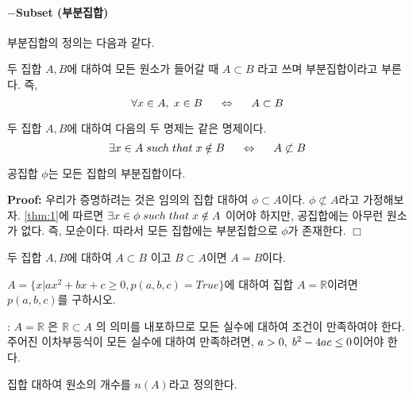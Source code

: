 \documentclass[paper=a4, fontsize=11pt]{scrartcl} %
\numberwithin{equation}{section} %
\numberwithin{figure}{section} %
\numberwithin{table}{section} %
\theoremstyle{plain}
\newcommand{\bigdef}[2]{\index{#1}\begin{dfn} {\rm #2} \end{dfn}}
\renewcommand{\qed}{\hfill $\Box$}
\renewenvironment{proof}{\par{\bf Proof:}}{\qed \par}
\newcommand{\Com}{,\Hs}
\newcommand{\Hs}{\hspace{0.1cm}}
\newcommand{\HS}{\hspace{0.5cm}}
\newcommand{\VS}{\vspace{0.3cm}}
\newcommand{\St}{\Hs such \Hs that \Hs}
\newcommand{\Nb}[1][A]{n(#1)}
\newcommand{\nin}{\notin}
\newcommand{\nsubset}{\not\subset}
\newcommand{\CSet}[2][x]{\{#1 | #2 \}}
\newcommand{\A}{$A$}
\newcommand{\B}{$B$}
\newcommand{\R}{\mathbb{R}}
\begin{document}
\paragraph{$-$Subset (부분집합)}

부분집합의 정의는 다음과 같다.

\bigdef{2}{두 집합 $A,B$에 대하여  모든 원소가  들어갈 때 $A \subset B$ 라고 쓰며 \A는 \B의 부분집합이라고 부른다. 즉,
\begin{equation*}
 \forall x\in A\Com x\in B \HS \Leftrightarrow \HS A\subset B
\end{equation*}
}
\begin{thm}
\label{thm:1}
 두 집합  $A,B$에 대하여 다음의 두 명제는 같은 명제이다.
 \begin{equation*}
  \exists x\in A\Hs such\Hs that\Hs x\nin B \HS \Leftrightarrow \HS A \nsubset B
 \end{equation*}
\end{thm}

\begin{cor}
 공집합 $\phi$는 모든 집합의 부분집합이다.
\end{cor}

\begin{proof}
 \HS 우리가 증명하려는 것은 임의의 집합  대하여 $\phi \subset A$이다. $\phi\nsubset A$라고 가정해보자.
 \ref{thm:1}에 따르면 \Hs $\exists x \in \phi \St x \nin A$ 이어야 하지만, 공집합에는 아무런 원소가 없다. 즉, 모순이다.
 따라서 모든 집합에는 부분집합으로 $\phi$가 존재한다.
\end{proof}

\begin{thm}
 \label{thm:2}
 두 집합 $A,B$에 대하여 $A \subset B$ 이고 $B \subset A$이면 $A=B$이다.
\end{thm}
\VS
\begin{exmp}
 $A=\CSet{ax^2+bx+c\geq 0, p(a,b,c)=True}$에 대하여 집합 $A=\R$이려면 $p(a,b,c)$를 구하시오.
 
 \VS
 
 : $A=\R$ 은 $\R \subset A$ 의 의미를 내포하므로 모든 실수에 대하여 조건이 만족하여야 한다. 주어진 이차부등식이 모든 실수에 대하여 만족하려면,
 $a>0\Com b^2 -4ac\leq 0$이어야 한다. 
\end{exmp}

\VS

\begin{dfn}
  집합  대하여  원소의 개수를 $\Nb$라고 정의한다.
\end{dfn}

\VS
\end{document}
